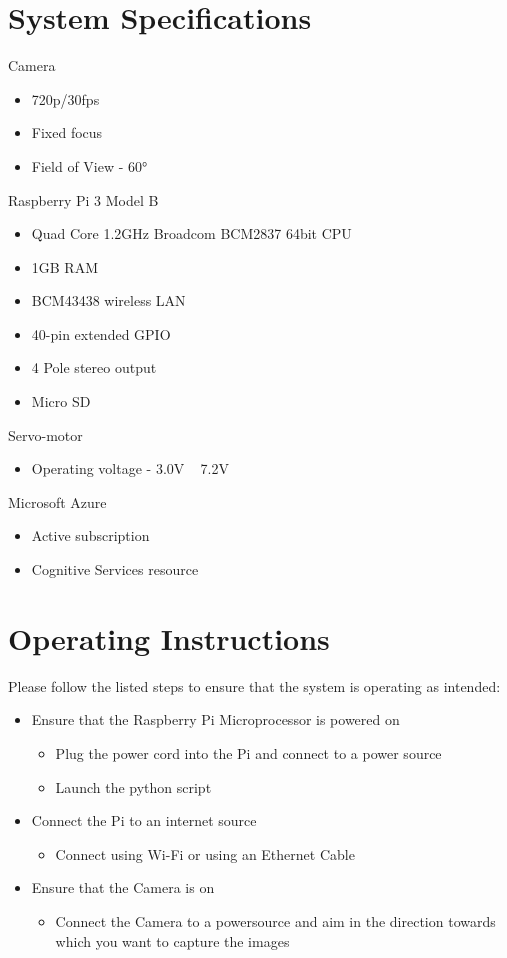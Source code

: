 \documentclass[a4paper,12pt]{article}
\begin{document}
\newpage
\section{System Specifications}
Camera
\begin{itemize}
    \item 720p/30fps
    \item Fixed focus
    \item Field of View - \ang{60}
\end{itemize}
Raspberry Pi 3 Model B
\begin{itemize}
    \item Quad Core 1.2GHz Broadcom BCM2837 64bit CPU
    \item 1GB RAM
    \item BCM43438 wireless LAN
    \item 40-pin extended GPIO
    \item 4 Pole stereo output
    \item Micro SD
\end{itemize}
Servo-motor
\begin{itemize}
    \item Operating voltage - 3.0V ~ 7.2V
\end{itemize}
Microsoft Azure
\begin{itemize}
    \item Active subscription
    \item Cognitive Services resource
\end{itemize}

\newpage
\section{Operating Instructions}

Please follow the listed steps to ensure that the system is operating as intended:

\begin{itemize}
    \item Ensure that the Raspberry Pi Microprocessor is powered on
    \begin{itemize}
        \item Plug the power cord into the Pi and connect to a power source
        \item Launch the python script
    \end{itemize}
    \item Connect the Pi to an internet source
    \begin{itemize}
        \item Connect using Wi-Fi or using an Ethernet Cable
    \end{itemize}
    \item Ensure that the Camera is on
    \begin{itemize}
        \item Connect the Camera to a powersource and aim in the direction towards which you want to capture the images
    \end{itemize}
\end{itemize}
\end{document}
